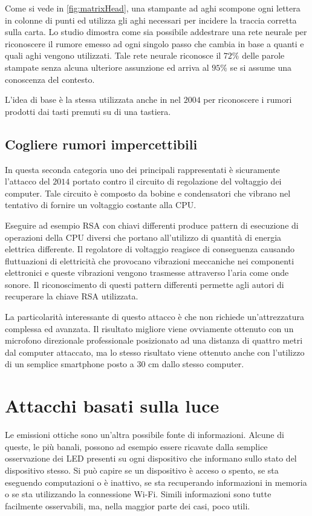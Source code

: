 			Come si vede in \cref{fig:matrixHead}, una stampante ad aghi scompone ogni lettera in colonne di punti ed utilizza gli aghi necessari per incidere la traccia corretta sulla carta. Lo studio dimostra come sia possibile addestrare una rete neurale per riconoscere il rumore emesso ad ogni singolo passo che cambia in base a quanti e quali aghi vengono utilizzati. Tale rete neurale riconosce il $72\%$ delle parole stampate senza alcuna ulteriore assunzione ed arriva al $95\%$ se si assume una conoscenza del contesto.
			
			L'idea di base è la stessa utilizzata anche in \cite{asonov2004keyboard} nel $2004$ per riconoscere i rumori prodotti dai tasti premuti su di una tastiera.
		
		\subsection{Cogliere rumori impercettibili}	
			In questa seconda categoria uno dei principali rappresentati è sicuramente l'attacco\cite{genkin2014rsa} del $2014$ portato contro il circuito di regolazione del voltaggio dei computer. Tale circuito è composto da bobine e condensatori che vibrano nel tentativo di fornire un voltaggio costante alla CPU.
			
			Eseguire ad esempio RSA con chiavi differenti produce pattern di esecuzione di operazioni della CPU diversi che portano all'utilizzo di quantità di energia elettrica differente. Il regolatore di voltaggio reagisce di conseguenza causando fluttuazioni di elettricità che provocano vibrazioni meccaniche nei componenti elettronici e queste vibrazioni vengono trasmesse attraverso l'aria come onde sonore. Il riconoscimento di questi pattern differenti permette agli autori di recuperare la chiave RSA utilizzata.
			
			La particolarità interessante di questo attacco è che non richiede un'attrezzatura complessa ed avanzata. Il risultato migliore viene ovviamente ottenuto con un microfono direzionale professionale posizionato ad una distanza di quattro metri dal computer attaccato, ma lo stesso risultato viene ottenuto anche con l'utilizzo di un semplice smartphone posto a 30 cm dallo stesso computer.
			
	\section{Attacchi basati sulla luce}
		Le emissioni ottiche sono un'altra possibile fonte di informazioni. Alcune di queste, le più banali, possono ad esempio essere ricavate dalla semplice osservazione dei \acs{LED} presenti su ogni dispositivo che informano sullo stato del dispositivo stesso. Si può capire se un dispositivo è acceso o spento, se sta eseguendo computazioni o è inattivo, se sta recuperando informazioni in memoria o se sta utilizzando la connessione Wi-Fi. Simili informazioni sono tutte facilmente osservabili, ma, nella maggior parte dei casi, poco utili.
		
